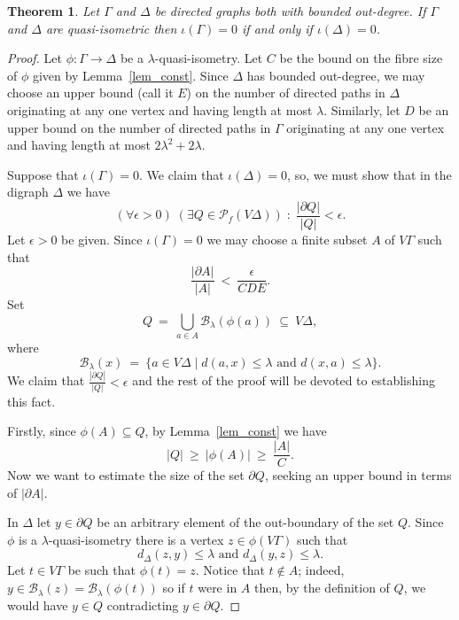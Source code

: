 \documentclass[11pt,a4paper,reqno]{amsart}
\newtheorem{theorem}{Theorem}[section]
\begin{document}
\begin{theorem}\label{thm_digraph_QSI}
Let $\Gamma$ and $\Delta$ be directed graphs both with bounded out-degree. 
If $\Gamma$ and $\Delta$ are quasi-isometric then $\iota(\Gamma)=0$ if and only if $\iota(\Delta)=0$. 
\end{theorem}
\begin{proof}
Let $\phi: \Gamma \rightarrow \Delta$ be a $\lambda$-quasi-isometry. Let
$C$ be the bound on the fibre size of $\phi$ given by Lemma~\ref{lem_const}.
Since $\Delta$ has bounded out-degree, we may choose an upper bound (call
it $E$) on the number of directed paths in $\Delta$ originating at any one
vertex and having length at most $\lambda$. Similarly, let $D$ be an
upper bound on the number of directed paths in $\Gamma$ originating at any
one vertex and having length at most $2 \lambda^2 + 2 \lambda$.

Suppose that $\iota(\Gamma)=0$. We claim that $\iota(\Delta)=0$, so, we must show that in the digraph $\Delta$ we have
\[
(\forall \epsilon > 0) \; (\exists Q \in \mathcal{P}_f(V\Delta)) \; : \; \frac{|\partial Q|}{|Q|} < \epsilon. 
\]
Let $\epsilon > 0$ be given. 
Since $\iota(\Gamma)=0$ we may choose a finite subset $A$ of $V\Gamma$
such that
\begin{equation}\label{eq_zero}
\frac{|\partial A|}{|A|} \ < \ \frac{\epsilon}{CDE}.
\end{equation}
Set
\[
Q \ = \ \bigcup_{a \in A} \mathcal{B}_{\lambda} (\phi(a)) \ \subseteq \ V\Delta,
\]
where
$$\mathcal{B}_{\lambda}(x) \ = \ \lbrace a \in V\Delta \mid d(a,x) \leq \lambda \textrm{ and } d(x,a) \leq \lambda \rbrace.$$
We claim that $\frac{|\partial Q|}{|Q|} < \epsilon$ and the rest of the proof will be devoted to establishing this fact. 

Firstly, since $\phi(A) \subseteq Q$, by Lemma~\ref{lem_const} we have
\begin{equation}\label{eq_one}
|Q| \ \geq \ |\phi(A)| \ \geq \ \frac{|A|}{C}.
\end{equation}
Now we want to estimate the size of the set $\partial Q$, seeking an upper bound in terms of $|\partial A|$.  

In $\Delta$ let $y \in \partial Q$ be an arbitrary element of the out-boundary of the set $Q$. 
Since $\phi$ is a $\lambda$-quasi-isometry there is a vertex
$z \in \phi(V\Gamma)$ such that
\begin{equation}\label{eq_nice}
d_{\Delta}(z,y) \leq \lambda  \textrm{ and } d_{\Delta}(y,z) \leq \lambda. 
\end{equation}
Let $t \in V \Gamma$ be such that $\phi(t) = z$.
Notice that $t \notin A$; indeed,
 $y \in \mathcal{B}_{\lambda} (z) = \mathcal{B}_{\lambda} (\phi(t))$ so
if $t$ were in $A$ then, by the definition of $Q$, we would have
$y \in Q$ contradicting $y \in \partial Q$. 


\end{proof}
\end{document}
